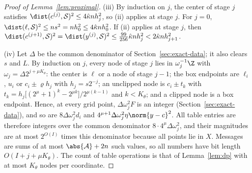 \begin{proof}[Proof of Lemma~\ref{lem:proximal}]
(iii) By induction on $j$, the center of stage $j$ satisfies
$\dist(c^{(j)},\mathcal S)^2\le4\hat\kappa nh_j^2$, so (ii) applies at stage
$j$. For $j=0$, $\dist(\ell,\mathcal S)^2\le ns^2=nh_0^2\le4\hat\kappa nh_0^2$.
If (ii) applies at stage $j$, then
$\dist(c^{(j+1)},\mathcal S)^2=\dist(y^{(j)},\mathcal S)^2
\le\frac{99}{256}\hat\kappa nh_j^2<2\hat\kappa nh_{j+1}^2$.

(iv) Let $\Delta$ be the common denominator of Section~\ref{sec:exact-data};
it also clears $s$ and $L$. By induction on $j$, every node of stage $j$ lies
in $\omega_j^{-1}\Z$ with $\omega_j=\Delta2^{j+\mu K_\theta}$: the center is
$\ell$ or a node of stage $j-1$; the box endpoints are $\ell_i$, $u_i$ or
$c_i\pm\varrho h_j$ with $h_j=s2^{-j}$; an unclipped node is $c_i\pm t_k$ with
$t_k=h_j\bigl[(2^\mu+1)^k-2^{\mu k}\bigr]/2^{\mu(k-1)}$ and $k<K_\theta$; and a
clipped node is a box endpoint. Hence, at every grid point, $\Delta\omega_j^2F$
is an integer (Section~\ref{sec:exact-data}), and so are $8\Delta\omega_j^2d_i$
and $4^{\mu+1}\Delta\omega_j^2\eta\norm{y-c}^2$. All table entries are
therefore integers over the common denominator $8\cdot4^\mu\Delta\omega_j^2$,
and their magnitudes are at most $2^{O(I)}$ times this denominator because
all points lie in $X$. Messages are sums of at most $\abs{\mathcal A}+2n$
such values, so all numbers have bit length $O(I+j+\mu K_\theta)$. The count
of table operations is that of Lemma~\ref{lem:dp} with at most $K_\theta$
nodes per coordinate.
\end{proof}

